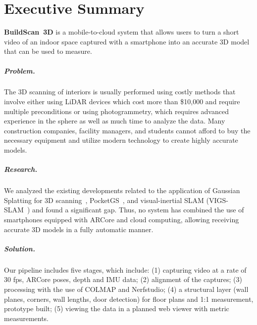 \chapter*{Executive Summary}

\textbf{BuildScan~3D} is a mobile-to-cloud system that allows users to turn a short video of an indoor space captured with a smartphone into an accurate 3D model that can be used to measure.

\paragraph{Problem.} The 3D scanning of interiors is usually performed using costly methods that involve either using LiDAR devices which cost more than \$10,000 and require multiple preconditions or using photogrammetry, which requires advanced experience in the sphere as well as much time to analyze the data. Many construction companies, facility managers, and students cannot afford to buy the necessary equipment and utilize modern technology to create highly accurate models.

\paragraph{Research.} We analyzed the existing developments related to the application of Gaussian Splatting for 3D scanning~\cite{kerbl3dgs}, PocketGS~\cite{pocketgs}, and visual-inertial SLAM (VIGS-SLAM~\cite{vigsslam}) and found a significant gap. Thus, no system has combined the use of smartphones equipped with ARCore and cloud computing, allowing receiving accurate 3D models in a fully automatic manner.

\paragraph{Solution.} Our pipeline includes five stages, which include: (1) capturing video at a rate of 30 fps, ARCore poses, depth and IMU data; (2) alignment of the captures; (3) processing with the use of COLMAP and Nerfstudio; (4) a structural layer (wall planes, corners, wall lengths, door detection) for floor plans and 1:1 measurement, prototype built; (5) viewing the data in a planned web viewer with metric measurements.

